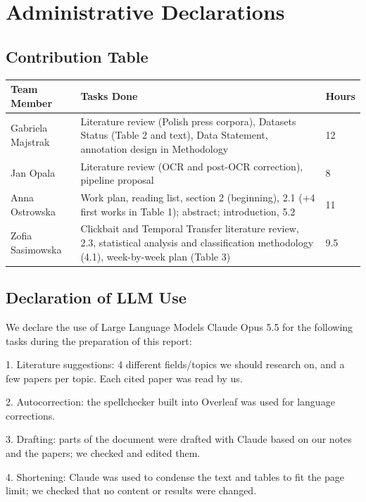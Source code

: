 \documentclass[11pt]{article}
\begin{document}
\section{Administrative Declarations}

\subsection{Contribution Table}
\begin{table}[H]
\centering
\small
\begin{tabular}{@{}p{2.1cm} p{4.1cm} p{0.7cm}@{}}
\toprule
\textbf{Team Member} & \textbf{Tasks Done} & \textbf{Hours} \\ \midrule
Gabriela Majstrak &Literature review (Polish press corpora), Datasets Status (Table 2 and text), Data Statement, annotation design in Methodology & 12\\
Jan Opala & Literature review (OCR and post-OCR correction), pipeline proposal & 8 \\
Anna Ostrowska & Work plan, reading list, section 2 (beginning), 2.1 (+4 first works in Table 1); abstract; introduction, 5.2 & 11 \\
Zofia Sasimowska & Clickbait and Temporal Transfer literature review, 2.3, statistical analysis and classification methodology (4.1), week-by-week plan (Table 3) & 9.5 \\
\bottomrule
\end{tabular}
\end{table}
\subsection{Declaration of LLM Use}
We declare the use of Large Language Models Claude Opus 5.5 for the following tasks during the preparation of this report: 

1. Literature suggestions: 4 different fields/topics we should research on, and a few papers per topic. Each cited paper was read by us.

2. Autocorrection: the spellchecker built into Overleaf was used for language corrections.

3. Drafting: parts of the document were drafted with Claude based on our notes and the papers; we checked and edited them.

4. Shortening: Claude was used to condense the text and tables to fit the page limit; we checked that no content or results were changed.



\end{document}
